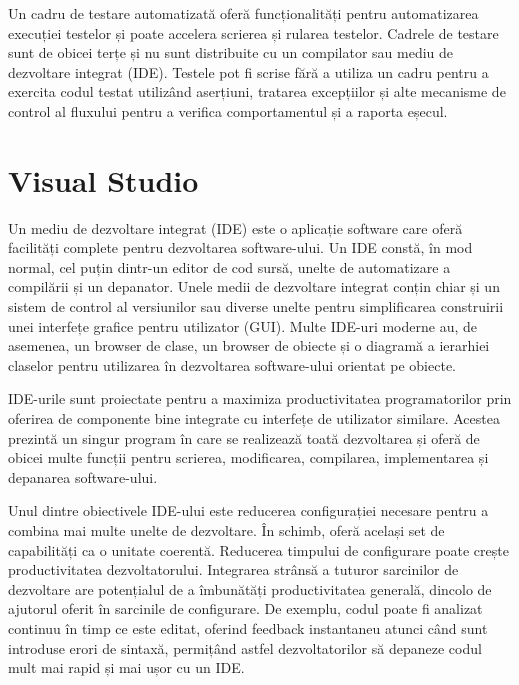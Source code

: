 \documentclass[a4paper,12pt]{report}
\begin{document}
Un cadru de testare automatizată oferă funcționalități pentru automatizarea execuției testelor și poate accelera scrierea și rularea testelor. Cadrele de testare sunt de obicei terțe și nu sunt distribuite cu un compilator sau mediu de dezvoltare integrat (IDE). Testele pot fi scrise fără a utiliza un cadru pentru a exercita codul testat utilizând aserțiuni, tratarea excepțiilor și alte mecanisme de control al fluxului pentru a verifica comportamentul și a raporta eșecul.

\section{Visual Studio}
Un mediu de dezvoltare integrat (IDE) este o aplicație software care oferă facilități complete pentru dezvoltarea software-ului. Un IDE constă, în mod normal, cel puțin dintr-un editor de cod sursă, unelte de automatizare a compilării și un depanator. Unele medii de dezvoltare integrat conțin chiar și un sistem de control al versiunilor sau diverse unelte pentru simplificarea construirii unei interfețe grafice pentru utilizator (GUI). Multe IDE-uri moderne au, de asemenea, un browser de clase, un browser de obiecte și o diagramă a ierarhiei claselor pentru utilizarea în dezvoltarea software-ului orientat pe obiecte.

IDE-urile sunt proiectate pentru a maximiza productivitatea programatorilor prin oferirea de componente bine integrate cu interfețe de utilizator similare. Acestea prezintă un singur program în care se realizează toată dezvoltarea și oferă de obicei multe funcții pentru scrierea, modificarea, compilarea, implementarea și depanarea software-ului.

Unul dintre obiectivele IDE-ului este reducerea configurației necesare pentru a combina mai multe unelte de dezvoltare. În schimb, oferă același set de capabilități ca o unitate coerentă. Reducerea timpului de configurare poate crește productivitatea dezvoltatorului. Integrarea strânsă a tuturor sarcinilor de dezvoltare are potențialul de a îmbunătăți productivitatea generală, dincolo de ajutorul oferit în sarcinile de configurare. De exemplu, codul poate fi analizat continuu în timp ce este editat, oferind feedback instantaneu atunci când sunt introduse erori de sintaxă, permițând astfel dezvoltatorilor să depaneze codul mult mai rapid și mai ușor cu un IDE.
\end{document}
